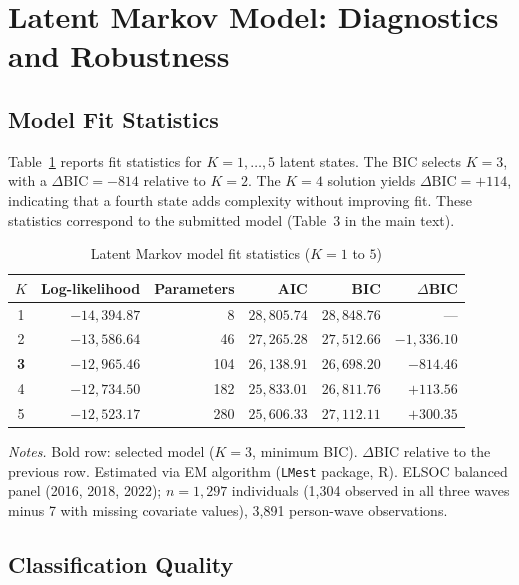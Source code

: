 \documentclass[12pt, a4paper]{article}
\newcommand{\tablenote}[1]{\vspace{4pt}\par\footnotesize\textit{Notes.} #1}
\begin{document}
\section{Latent Markov Model: Diagnostics and Robustness}
\label{sec:lmm}

\subsection{Model Fit Statistics}

Table~\ref{tab:A2_lmm_fit} reports fit statistics for $K = 1, \ldots, 5$
latent states. The BIC selects $K = 3$, with a $\Delta\text{BIC} = -814$
relative to $K = 2$. The $K = 4$ solution yields $\Delta\text{BIC} = +114$,
indicating that a fourth state adds complexity without improving fit.
These statistics correspond to the submitted model (Table~3 in the main text).

\begin{table}[H]
\centering
\caption{Latent Markov model fit statistics ($K = 1$ to $5$)}
\label{tab:A2_lmm_fit}
\small
\begin{tabular}{crrrrr}
\hline\hline
  $K$ & Log-likelihood & Parameters & AIC & BIC & $\Delta$BIC \\
\hline
  1              & $-14{,}394.87$ &   8 & $28{,}805.74$ & $28{,}848.76$ & ---           \\
  2              & $-13{,}586.64$ &  46 & $27{,}265.28$ & $27{,}512.66$ & $-1{,}336.10$ \\
  \textbf{3}     & $-12{,}965.46$ & 104 & $26{,}138.91$ & $26{,}698.20$ & $-814.46$     \\
  4              & $-12{,}734.50$ & 182 & $25{,}833.01$ & $26{,}811.76$ & $+113.56$     \\
  5              & $-12{,}523.17$ & 280 & $25{,}606.33$ & $27{,}112.11$ & $+300.35$     \\
\hline\hline
\end{tabular}
\tablenote{Bold row: selected model ($K = 3$, minimum BIC).
$\Delta$BIC relative to the previous row.
Estimated via EM algorithm (\texttt{LMest} package, R).
ELSOC balanced panel (2016, 2018, 2022); $n = 1{,}297$ individuals
(1{,}304 observed in all three waves minus 7 with missing covariate values),
3{,}891 person-wave observations.}
\end{table}

\subsection{Classification Quality}
\end{document}
